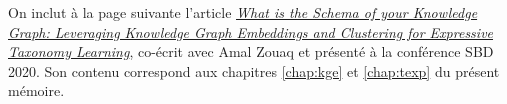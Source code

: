 
On inclut à la page suivante l'article \href{https://dl.acm.org/doi/10.1145/3391274.3393637}{\textit{What is the Schema of your Knowledge Graph: Leveraging Knowledge Graph Embeddings and Clustering for Expressive Taxonomy Learning}}, co-écrit avec Amal Zouaq et présenté à la conférence SBD 2020. Son contenu correspond aux chapitres \ref{chap:kge} et \ref{chap:texp} du présent mémoire.


% 
% 
% 


